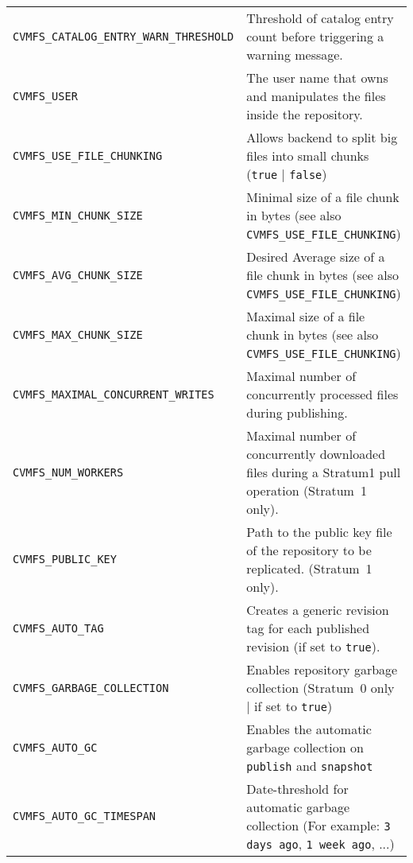 \begin{longtable}{lX}
		\tt CVMFS\_CATALOG\_ENTRY\_WARN\_THRESHOLD	& Threshold of catalog entry count before triggering a warning message.\\
		\tt CVMFS\_USER						& The user name that owns and manipulates the files inside the repository.\\
		\tt CVMFS\_USE\_FILE\_CHUNKING		& Allows backend to split big files into small chunks (\texttt{true} | \texttt{false})\\
		\tt CVMFS\_MIN\_CHUNK\_SIZE			& Minimal size of a file chunk in bytes \newline (see also \texttt{CVMFS\_USE\_FILE\_CHUNKING})\\
		\tt CVMFS\_AVG\_CHUNK\_SIZE			& Desired Average size of a file chunk in bytes \newline (see also \texttt{CVMFS\_USE\_FILE\_CHUNKING})\\
		\tt CVMFS\_MAX\_CHUNK\_SIZE			& Maximal size of a file chunk in bytes \newline (see also \texttt{CVMFS\_USE\_FILE\_CHUNKING})\\
		\tt CVMFS\_MAXIMAL\_CONCURRENT\_WRITES	& Maximal number of concurrently processed files during publishing.\\
		\tt CVMFS\_NUM\_WORKERS	& Maximal number of concurrently downloaded files during a Stratum1 pull operation (Stratum~1 only).\\
		\tt CVMFS\_PUBLIC\_KEY	& Path to the public key file of the repository to be replicated. (Stratum~1 only).\\
		\tt CVMFS\_AUTO\_TAG	& Creates a generic revision tag for each published revision (if set to \texttt{true}).\\
		\tt CVMFS\_GARBAGE\_COLLECTION			& Enables repository garbage collection \newline (Stratum~0 only | if set to \texttt{true})\\
		\tt CVMFS\_AUTO\_GC			& Enables the automatic garbage collection on \texttt{publish} and \texttt{snapshot}\\
		\tt CVMFS\_AUTO\_GC\_TIMESPAN			& Date-threshold for automatic garbage collection \newline (For example: \texttt{3 days ago}, \texttt{1 week ago}, ...)\\
		\bottomrule
	\end{longtable}
